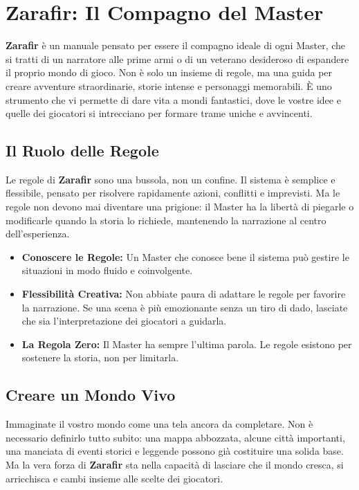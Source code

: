 \documentclass[../manuale_main.tex]{subfiles}
\begin{document}
\section{Zarafir: Il Compagno del Master}

\textbf{Zarafir} è un manuale pensato per essere il compagno ideale di ogni Master, che si tratti di un narratore alle prime armi o di un veterano desideroso di espandere il proprio mondo di gioco. Non è solo un insieme di regole, ma una guida per creare avventure straordinarie, storie intense e personaggi memorabili. È uno strumento che vi permette di dare vita a mondi fantastici, dove le vostre idee e quelle dei giocatori si intrecciano per formare trame uniche e avvincenti.

\vspace{0.3cm}

\subsection{Il Ruolo delle Regole}
Le regole di \textbf{Zarafir} sono una bussola, non un confine. Il sistema è semplice e flessibile, pensato per risolvere rapidamente azioni, conflitti e imprevisti. Ma le regole non devono mai diventare una prigione: il Master ha la libertà di piegarle o modificarle quando la storia lo richiede, mantenendo la narrazione al centro dell’esperienza.

\begin{itemize}
    \item \textbf{Conoscere le Regole:} Un Master che conosce bene il sistema può gestire le situazioni in modo fluido e coinvolgente.
    
    \item \textbf{Flessibilità Creativa:} Non abbiate paura di adattare le regole per favorire la narrazione. Se una scena è più emozionante senza un tiro di dado, lasciate che sia l'interpretazione dei giocatori a guidarla.
    
    \item \textbf{La Regola Zero:} Il Master ha sempre l'ultima parola. Le regole esistono per sostenere la storia, non per limitarla.
\end{itemize}

\vspace{0.3cm}

\subsection{Creare un Mondo Vivo}
Immaginate il vostro mondo come una tela ancora da completare. Non è necessario definirlo tutto subito: una mappa abbozzata, alcune città importanti, una manciata di eventi storici e leggende possono già costituire una solida base. Ma la vera forza di \textbf{Zarafir} sta nella capacità di lasciare che il mondo cresca, si arricchisca e cambi insieme alle scelte dei giocatori.
\end{document}
